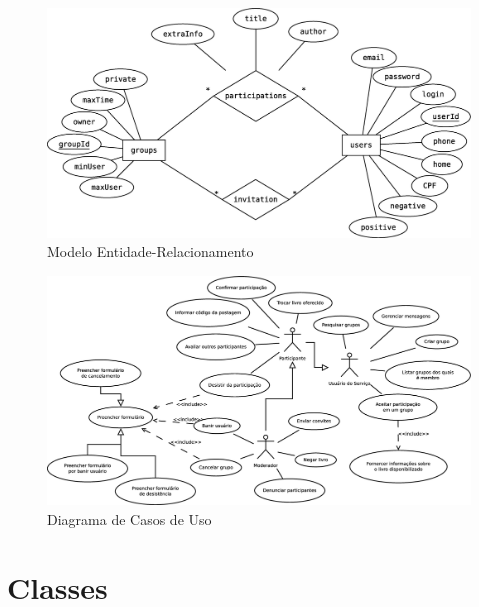 \documentclass[a4paper]{article}
\begin{document}
 \begin{figure}[H]
  \includegraphics[angle=90,totalheight=\textheight]{modeloER.eps}
  \caption{Modelo Entidade-Relacionamento}
 \end{figure}
 
 \begin{figure}[H]
  \includegraphics[angle=90,totalheight=\textheight]{casosDeUso.eps}
  \caption{Diagrama de Casos de Uso}
 \end{figure}
 
 \section{Classes}
 
\end{document}
